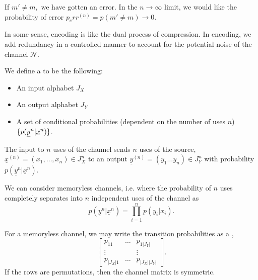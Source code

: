 If $m'\neq m,$ we have gotten an error. In the $n\to \infty$ limit, we would like the probability of error $p_err^{(n)}=p(m'\neq m) \to 0$.

In some sense, encoding is like the dual process of compression. In encoding, we add redundancy in a controlled manner to account for the potential noise of the channel $\mathcal{N}$.

\begin{defn}
    We define a  to be the following:
    \begin{itemize}
        \item An input alphabet $J_X$
        \item An output alphabet $J_Y$
        \item A set of conditional probabilities (dependent on the number of uses $n$) $\{p(\underline y^{n}| \underline x^{n})\}$.
    \end{itemize}
\end{defn}
The input to $n$ uses of the channel sends $n$ uses of the source, $\underline{x}^{(n)}=(x_1,\ldots, x_n)\in J_X^n$ to an output $\underline{y}^{(n)}=(y_1\ldots y_n)\in J_Y^n$ with probability $p(\underline y^{n}| \underline x^{n})$.

We can consider memoryless channels, i.e. where the probability of $n$ uses completely separates into $n$ independent uses of the channel as
\begin{equation}
    p(\underline y^{n}| \underline x^{n}) = \prod_{i=1}^n p(y_i | x_i).
\end{equation}

For a memoryless channel, we may write the transition probabilities as a ,
\begin{equation}
    \begin{bmatrix}
    p_{11} & \ldots & p_{1|J_Y|}\\
    \vdots & & \vdots\\
    p_{|J_X|1} & \ldots &p_{|J_X||J_Y|}
    \end{bmatrix}.
\end{equation}
If the rows are permutations, then the channel matrix is symmetric.

